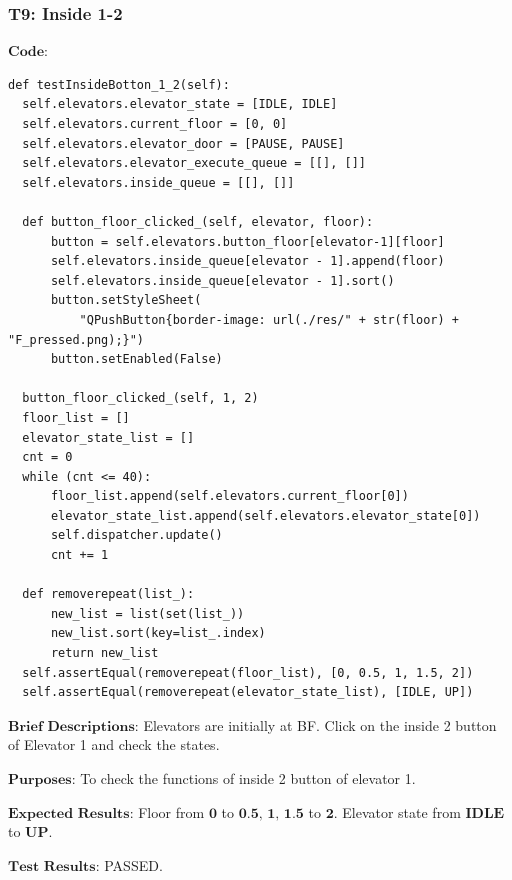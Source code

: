 \documentclass{article}
\begin{document}
\subsubsection*{T9: Inside 1-2}
$\textbf{Code:}$
\begin{lstlisting}
def testInsideBotton_1_2(self):
  self.elevators.elevator_state = [IDLE, IDLE]
  self.elevators.current_floor = [0, 0]
  self.elevators.elevator_door = [PAUSE, PAUSE]
  self.elevators.elevator_execute_queue = [[], []]
  self.elevators.inside_queue = [[], []]

  def button_floor_clicked_(self, elevator, floor):
      button = self.elevators.button_floor[elevator-1][floor]
      self.elevators.inside_queue[elevator - 1].append(floor)
      self.elevators.inside_queue[elevator - 1].sort()
      button.setStyleSheet(
          "QPushButton{border-image: url(./res/" + str(floor) + "F_pressed.png);}")
      button.setEnabled(False)

  button_floor_clicked_(self, 1, 2)
  floor_list = []
  elevator_state_list = []
  cnt = 0
  while (cnt <= 40):
      floor_list.append(self.elevators.current_floor[0])
      elevator_state_list.append(self.elevators.elevator_state[0])
      self.dispatcher.update()
      cnt += 1

  def removerepeat(list_):
      new_list = list(set(list_))
      new_list.sort(key=list_.index)
      return new_list
  self.assertEqual(removerepeat(floor_list), [0, 0.5, 1, 1.5, 2])
  self.assertEqual(removerepeat(elevator_state_list), [IDLE, UP])
\end{lstlisting}

$\textbf{Brief Descriptions:}$
Elevators are initially at BF. Click on the inside 2 button of Elevator 1 and check the states.

$\textbf{Purposes:}$
To check the functions of inside 2 button of elevator 1.

$\textbf{Expected Results:}$
Floor from $\textbf{0}$ to $\textbf{0.5, 1, 1.5}$ to $\textbf{2}$. Elevator state from $\textbf{IDLE}$ to $\textbf{UP}$.

$\textbf{Test Results:}$
PASSED.
\end{document}

